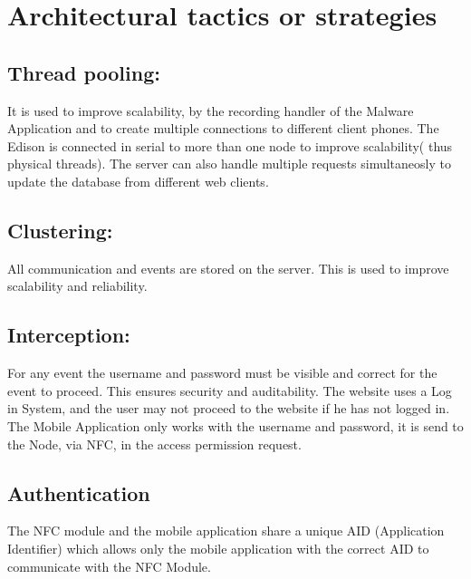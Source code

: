 \documentclass[a4paper,12pt,titlepage]{article}
\begin{document}
\newpage\section{Architectural tactics or strategies}
	\subsection{Thread pooling: }It is used to improve scalability, by the recording handler of the Malware Application and to create multiple connections to different client phones. The Edison is connected in serial to more than one node to improve scalability( thus physical threads). The server can also handle multiple requests simultaneosly to update the database from different web clients.
	\subsection{Clustering: } All communication and events are stored on the server. This is used to improve scalability and reliability. 
	\subsection{Interception: }For any event the username and password must be visible and correct for the event to proceed. This ensures security and auditability. The website uses a Log in System, and the user may not proceed to the website if he has not logged in. The Mobile Application only works with the username and password, it is send to the Node, via NFC, in the access permission request. 
	\subsection{Authentication}The NFC module and the mobile application share a unique AID (Application Identifier) which allows only the mobile application with the correct AID to communicate with the NFC Module.





\end{document}
